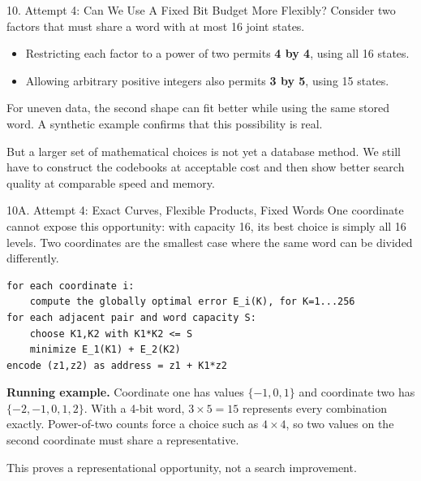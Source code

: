 \documentclass[
  ignorenonframetext,
  aspectratio=169,
]{beamer}
\providecommand{\tightlist}{%
  \setlength{\itemsep}{0pt}\setlength{\parskip}{0pt}}
\begin{document}
\begin{frame}{10. Attempt 4: Can We Use A Fixed Bit Budget More
Flexibly?}
\protect{}\label{10-attempt-4-can-we-use-a-fixed-bit-budget-more-flexibly}
Consider two factors that must share a word with at most 16 joint
states.

\begin{itemize}
\tightlist
\item
  Restricting each factor to a power of two permits \textbf{4 by 4},
  using all 16 states.
\item
  Allowing arbitrary positive integers also permits \textbf{3 by 5},
  using 15 states.
\end{itemize}

For uneven data, the second shape can fit better while using the same
stored word. A synthetic example confirms that this possibility is real.

But a larger set of mathematical choices is not yet a database method.
We still have to construct the codebooks at acceptable cost and then
show better search quality at comparable speed and memory.
\end{frame}

\begin{frame}[fragile]{10A. Attempt 4: Exact Curves, Flexible Products, Fixed Words}
\small
One coordinate cannot expose this opportunity: with capacity 16, its best
choice is simply all 16 levels. Two coordinates are the smallest case where
the same word can be divided differently.

\begin{verbatim}
for each coordinate i:
    compute the globally optimal error E_i(K), for K=1...256
for each adjacent pair and word capacity S:
    choose K1,K2 with K1*K2 <= S
    minimize E_1(K1) + E_2(K2)
encode (z1,z2) as address = z1 + K1*z2
\end{verbatim}

\textbf{Running example.} Coordinate one has values $\{-1,0,1\}$ and
coordinate two has $\{-2,-1,0,1,2\}$. With a 4-bit word, $3\times5=15$
represents every combination exactly. Power-of-two counts force a choice
such as $4\times4$, so two values on the second coordinate must share a
representative.

This proves a representational opportunity, not a search improvement.
\end{frame}
\end{document}
